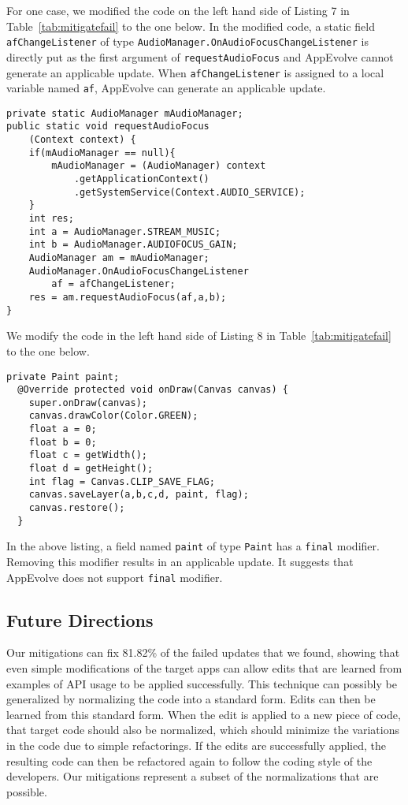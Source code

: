 For one case, we modified the code on the left hand side of Listing 7 in Table~\ref{tab:mitigatefail} to the one below. In the modified code, a static field {\tt afChangeListener} of type {\tt AudioManager.OnAudioFocusChangeListener} is directly put as the first argument of {\tt requestAudioFocus} and AppEvolve cannot generate an applicable update. When {\tt afChangeListener} is assigned to a local variable named {\tt af}, AppEvolve can generate an applicable update.
\begin{lstlisting}[language=text,numbers=none]
private static AudioManager mAudioManager;
public static void requestAudioFocus
    (Context context) {
    if(mAudioManager == null){
        mAudioManager = (AudioManager) context
            .getApplicationContext()
            .getSystemService(Context.AUDIO_SERVICE);
    }
    int res;
    int a = AudioManager.STREAM_MUSIC;
    int b = AudioManager.AUDIOFOCUS_GAIN;
    AudioManager am = mAudioManager;
    AudioManager.OnAudioFocusChangeListener
        af = afChangeListener;
    res = am.requestAudioFocus(af,a,b);
}

\end{lstlisting}


We modify the code in the left hand side of Listing 8 in Table~\ref{tab:mitigatefail} to the one below.
\begin{lstlisting}[language=text,numbers=none]
private Paint paint;
  @Override protected void onDraw(Canvas canvas) {
    super.onDraw(canvas);
    canvas.drawColor(Color.GREEN);
    float a = 0;
    float b = 0;
    float c = getWidth();
    float d = getHeight();
    int flag = Canvas.CLIP_SAVE_FLAG;
    canvas.saveLayer(a,b,c,d, paint, flag);
    canvas.restore();
  }
\end{lstlisting}
In the above listing, a field named {\tt paint} of type {\tt Paint} has a {\tt final} modifier. Removing this modifier results in an applicable update. It suggests that AppEvolve does not support {\tt final} modifier.



\subsection{Future Directions}
Our mitigations can fix 81.82\% of the failed updates that we found,
showing that even simple modifications of the target apps can allow
edits that are learned from examples of API usage to be applied
successfully. This technique can possibly be generalized by normalizing the
code into a standard form. Edits can then be learned from this standard
form. When the edit is applied to a new piece of code, that target code
should also be normalized, which should minimize the variations in the code
due to simple refactorings. If the edits are successfully applied, the
resulting code can then be refactored again to follow the coding
style of the developers.  Our mitigations represent a subset of the normalizations that are
possible.

